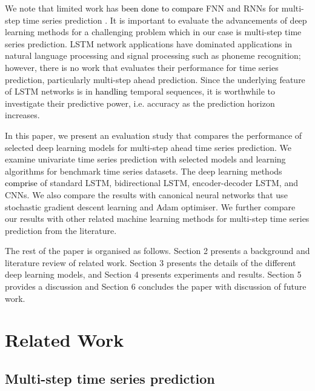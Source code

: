 \documentclass{ieeeaccess}
\begin{document}
 We note that limited work has \textcolor{black}{been done to compare} FNN and RNNs for multi-step time series prediction \cite{koskela1996time,chandra2016evaluation}. It is important to evaluate the advancements of deep learning methods  for a challenging problem which in our case is multi-step time series prediction.    LSTM network  applications have dominated applications in natural language processing and signal processing  such as phoneme recognition; however, there is no work that evaluates their performance for time series prediction, particularly multi-step ahead prediction. Since the underlying feature of LSTM networks is in \textcolor{black}{handling} temporal sequences, it is worthwhile to investigate   their predictive power, i.e. accuracy as the prediction horizon increases.  

  
 In this paper, we present an evaluation study that compares the performance  of selected   deep learning models  for multi-step ahead time series prediction.  We   examine univariate  time series prediction  with selected models and learning algorithms for benchmark time series datasets. The  deep learning methods \textcolor{black}{comprise} of   standard LSTM, bidirectional  LSTM,    encoder-decoder LSTM, and CNNs. We also compare the results with canonical  neural networks that use stochastic gradient descent learning and Adam optimiser.  We further compare our results with other related machine learning methods for multi-step time series prediction  from the literature. 
 
 

The rest of the paper is organised as follows. Section 2 presents a background and literature review of related work. Section 3 presents the details of the different deep learning models,  and Section 4 presents experiments and results. Section 5 provides a discussion and Section 6 concludes the paper with discussion of future work. 

\section{Related Work} 

\subsection{Multi-step time series prediction}

  
\end{document}
